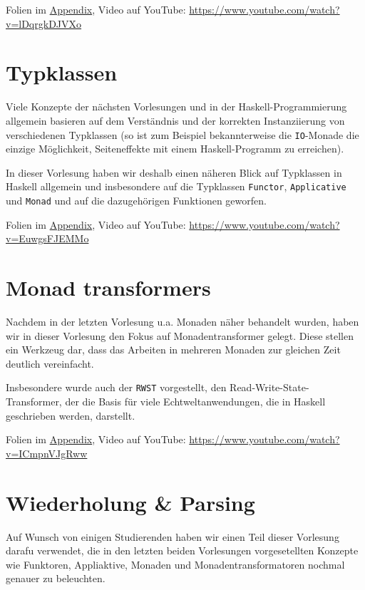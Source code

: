 \documentclass[10pt,a4paper]{article}
\begin{document}
\smallskip\smallskip
Folien im \hyperref[v1]{Appendix}, Video auf YouTube: \;\url{https://www.youtube.com/watch?v=lDqrgkDJVXo}

\section{Typklassen}

Viele Konzepte der nächsten Vorlesungen und in der Haskell-Programmierung allgemein basieren auf dem Verständnis und der korrekten Instanziierung von verschiedenen Typklassen (so ist zum Beispiel bekannterweise die \texttt{IO}-Monade die einzige Möglichkeit, Seiteneffekte mit einem Haskell-Programm zu erreichen).

In dieser Vorlesung haben wir deshalb einen näheren Blick auf Typklassen in Haskell allgemein und insbesondere auf die Typklassen \texttt{Functor}, \texttt{Applicative} und \texttt{Monad} und auf die dazugehörigen Funktionen geworfen.

\smallskip\smallskip
Folien im \hyperref[v2]{Appendix}, Video auf YouTube: \;\url{https://www.youtube.com/watch?v=EuwgsFJEMMo}

\section{Monad transformers}

Nachdem in der letzten Vorlesung u.a. Monaden näher behandelt wurden, haben wir in dieser Vorlesung den Fokus auf Monadentransformer gelegt. Diese stellen ein Werkzeug dar, dass das Arbeiten in mehreren Monaden zur gleichen Zeit deutlich vereinfacht.

Insbesondere wurde auch der \texttt{RWST} vorgestellt, den Read-Write-State-Transformer, der die Basis für viele Echtweltanwendungen, die in Haskell geschrieben werden, darstellt.

\smallskip\smallskip
Folien im \hyperref[v3]{Appendix}, Video auf YouTube: \;\url{https://www.youtube.com/watch?v=ICmpnVJgRww}

\section{Wiederholung \& Parsing}

Auf Wunsch von einigen Studierenden haben wir einen Teil dieser Vorlesung darafu verwendet, die in den letzten beiden Vorlesungen vorgesetellten Konzepte wie Funktoren, Appliaktive, Monaden und Monadentransformatoren nochmal genauer zu beleuchten.
\end{document}
